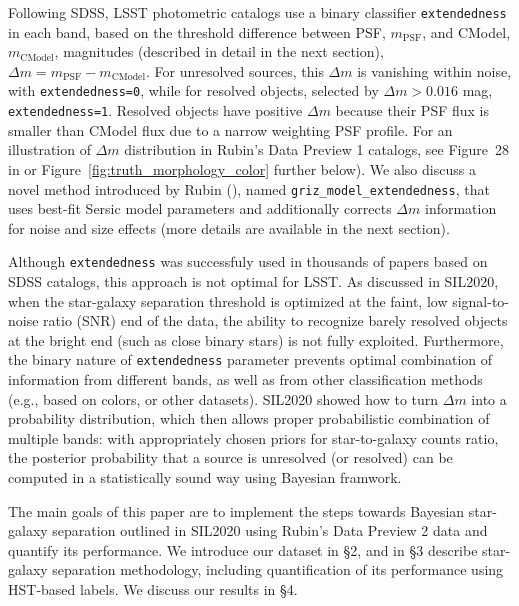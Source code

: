 Following SDSS, LSST photometric catalogs use a binary classifier \texttt{extendedness} in each band, based on the
threshold difference between PSF, \(m_{\mathrm{PSF}}\), and CModel, \(m_{\mathrm{CModel}}\),
magnitudes (described in detail in the next section), \(\Delta m = m_{\mathrm{PSF}} - m_{\mathrm{CModel}}\).
For unresolved sources, this \(\Delta m \)
is vanishing within noise, with \texttt{extendedness=0}, while for resolved objects, selected by \(\Delta m >
0.016\) mag, \texttt{extendedness=1}. Resolved objects have positive \(\Delta m \) because their
PSF flux is smaller than CModel flux due to a narrow weighting PSF profile. For an illustration of \(\Delta m \)
distribution in Rubin's Data Preview 1 catalogs, see Figure~28 in \cite{2026AJ....171..360V} or
Figure~\ref{fig:truth_morphology_color} further below). We also discuss a novel method introduced by
Rubin (\citealt{2026arXiv261022613O}), named \texttt{griz\_model\_extendedness}, 
that uses best-fit Sersic model parameters and additionally corrects \(\Delta m \) information for
noise and size effects (more details are available in the next section). 

Although  \texttt{extendedness} was successfuly used in thousands of papers based on SDSS catalogs, this
approach is not optimal for LSST. As discussed in SIL2020, when the star-galaxy separation threshold is optimized
at the faint, low signal-to-noise ratio (SNR) end of the data, the ability to recognize barely
resolved objects at the bright end (such as close binary stars) is not fully exploited. 
Furthermore, the binary nature of \texttt{extendedness} parameter prevents optimal combination of information from
different bands, as well as from other classification methods (e.g., based on colors, or other datasets). SIL2020 showed how
to turn \(\Delta m \) into a probability distribution, which then allows proper probabilistic combination of multiple bands:
with appropriately chosen priors for star-to-galaxy counts ratio, the posterior probability that a source is unresolved
(or resolved) can be computed in a statistically sound way using Bayesian framwork. 

The main goals of this paper are to implement the steps towards Bayesian star-galaxy separation outlined in SIL2020
using Rubin's Data Preview 2 data and quantify its performance. We introduce our dataset in \S 2, and in \S 3 describe
star-galaxy separation methodology, including quantification of its performance using HST-based labels. We discuss
our results
in \S 4.  


